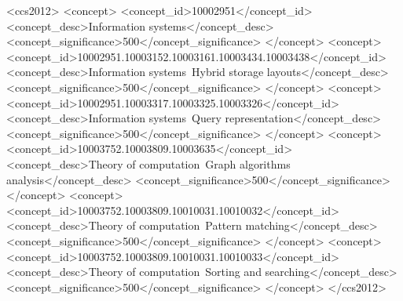%
%

\begin{CCSXML}
<ccs2012>
<concept>
<concept_id>10002951</concept_id>
<concept_desc>Information systems</concept_desc>
<concept_significance>500</concept_significance>
</concept>
<concept>
<concept_id>10002951.10003152.10003161.10003434.10003438</concept_id>
<concept_desc>Information systems~Hybrid storage layouts</concept_desc>
<concept_significance>500</concept_significance>
</concept>
<concept>
<concept_id>10002951.10003317.10003325.10003326</concept_id>
<concept_desc>Information systems~Query representation</concept_desc>
<concept_significance>500</concept_significance>
</concept>
<concept>
<concept_id>10003752.10003809.10003635</concept_id>
<concept_desc>Theory of computation~Graph algorithms analysis</concept_desc>
<concept_significance>500</concept_significance>
</concept>
<concept>
<concept_id>10003752.10003809.10010031.10010032</concept_id>
<concept_desc>Theory of computation~Pattern matching</concept_desc>
<concept_significance>500</concept_significance>
</concept>
<concept>
<concept_id>10003752.10003809.10010031.10010033</concept_id>
<concept_desc>Theory of computation~Sorting and searching</concept_desc>
<concept_significance>500</concept_significance>
</concept>
</ccs2012>
\end{CCSXML}

